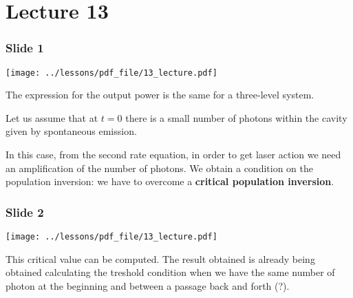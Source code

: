 \documentclass[../main/main.tex]{subfiles}
\begin{document}
\pagestyle{plain}

\section{Lecture 13}


\subsubsection*{Slide 1}

\begin{minipage}[]{0.5\linewidth}
\centering
\texttt{[image: ../lessons/pdf\_file/13\_lecture.pdf]}
\end{minipage}
\hspace{0.3cm}\vspace{0.3cm}
\begin{minipage}[c]{0.47\linewidth}

The expression for the output power is the same for a three-level system.

Let us assume that at \( t=0 \) there is a small number of photons within the cavity given by spontaneous emission.

In this case, from the second rate equation, in order to get laser action we need an amplification of the number of photons. We obtain a condition on the population inversion: we have to overcome a \textbf{critical population inversion}.

\end{minipage}

\subsubsection*{Slide 2}

\begin{minipage}[]{0.5\linewidth}
\centering
\texttt{[image: ../lessons/pdf\_file/13\_lecture.pdf]}
\end{minipage}
\hspace{0.3cm}\vspace{0.3cm}
\begin{minipage}[c]{0.47\linewidth}

This critical value can be computed. The result obtained is already being obtained calculating the treshold condition when we have the same number of photon at the beginning and between a passage back and forth (?).

\end{minipage}
\end{document}
